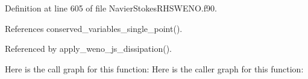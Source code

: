 Definition at line 605 of file Navier\+Stokes\+R\+H\+S\+W\+E\+N\+O.\+f90.



References conserved\+\_\+variables\+\_\+single\+\_\+point().



Referenced by apply\+\_\+weno\+\_\+js\+\_\+dissipation().

Here is the call graph for this function\+:
Here is the caller graph for this function\+:
\hypertarget{namespacenavierstokesrhsweno_a218ed3a33c33cf47975e22571e34c3c3}{}\label{namespacenavierstokesrhsweno_a218ed3a33c33cf47975e22571e34c3c3} 
